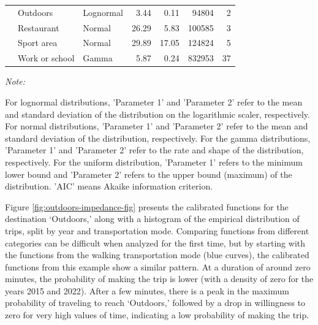 \documentclass[preprint, 3p,
authoryear]{elsarticle} %
\begin{document}
\begin{table}
{\begin{threeparttable}
\begin{tabular}[t]{rllrrrr}
 & Outdoors & Lognormal & 3.44 & 0.11 & 94804 & 2\\

 & Restaurant & Normal & 26.29 & 5.83 & 100585 & 3\\

 & Sport area & Normal & 29.89 & 17.05 & 124824 & 5\\

\multirow[t]{-7}{*}{\raggedleft\arraybackslash 2022} & Work or school & Gamma & 5.87 & 0.24 & 832953 & 37\\
\bottomrule
\end{tabular}
\begin{tablenotes}
\item \textit{Note: } 
\item For lognormal distributions, 'Parameter 1' and 'Parameter 2' refer to the mean and standard deviation of the distribution on the logarithmic scaler, respectively. For normal distributions, 'Parameter 1' and 'Parameter 2' refer to the mean and standard deviation of the distribution, respectively. For the gamma distributions, 'Parameter 1' and 'Parameter 2' refer to the rate and shape of the distribution, respectively. For the uniform distribution,  'Parameter 1' refers to the minimum lower bound and 'Parameter 2'  refers to the upper bound (maximum) of the distribution.  'AIC' means Akaike information criterion.
\end{tablenotes}
\end{threeparttable}}
\end{table}

Figure \ref{fig:outdoors-impedance-fig} presents the calibrated
functions for the destination `Outdoors,' along with a histogram of the
empirical distribution of trips, split by year and transportation mode.
Comparing functions from different categories can be difficult when
analyzed for the first time, but by starting with the functions from the
walking transportation mode (blue curves), the calibrated functions from
this example show a similar pattern. At a duration of around zero
minutes, the probability of making the trip is lower (with a density of
zero for the years 2015 and 2022). After a few minutes, there is a peak
in the maximum probability of traveling to reach `Outdoors,' followed by
a drop in willingness to zero for very high values of time, indicating a
low probability of making the trip.
\end{document}
